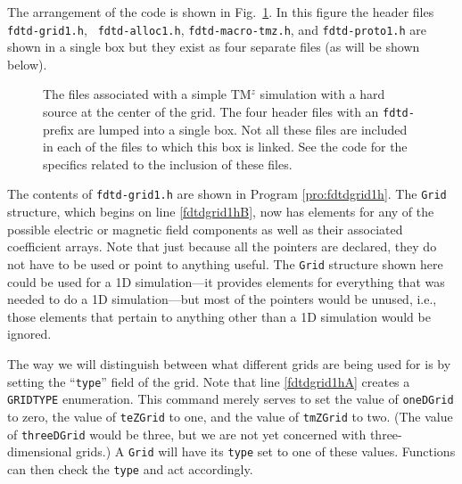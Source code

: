 The arrangement of the code is shown in Fig.\ \ref{fig:filesTmZ}.  In
this figure the header files {\tt fdtd-grid1.h}, {\tt
fdtd-alloc1.h}, {\tt fdtd-macro-tmz.h}, and {\tt fdtd-proto1.h} are
shown in a single box but they exist as four separate files (as will
be shown below).

\begin{figure}
  \begin{center}
  \end{center} \caption{The files associated with a simple TM$^z$
  simulation with a hard source at the center of the grid.  The four
  header files with an {\tt fdtd-} prefix are lumped into a single
  box.  Not all these files are included in each of the files to which
  this box is linked.  See the code for the specifics related to the
  inclusion of these files. }
  \label{fig:filesTmZ}
\end{figure}

The contents of {\tt fdtd-grid1.h} are shown in Program
\ref{pro:fdtdgrid1h}.  The {\tt Grid} structure, which begins on line
\ref{fdtdgrid1hB}, now has elements for any of the possible electric
or magnetic field components as well as their associated coefficient
arrays.  Note that just because all the pointers are declared, they do
not have to be used or point to anything useful.  The {\tt Grid}
structure shown here could be used for a 1D simulation---it provides
elements for everything that was needed to do a 1D simulation---but
most of the pointers would be unused, i.e., those elements that
pertain to anything other than a 1D simulation would be ignored.

The way we will distinguish between what different grids are being
used for is by setting the ``{\tt type}'' field of the grid.  Note
that line \ref{fdtdgrid1hA} creates a {\tt GRIDTYPE} enumeration.
This command merely serves to set the value of {\tt oneDGrid} to zero,
the value of {\tt teZGrid} to one, and the value of {\tt tmZGrid} to
two.  (The value of {\tt threeDGrid} would be three, but we are not
yet concerned with three-dimensional grids.)  A {\tt Grid} will have
its {\tt type} set to one of these values.  Functions can then check
the {\tt type} and act accordingly.

